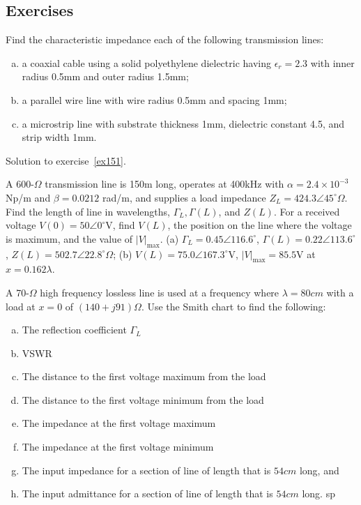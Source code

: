 \begin{mdframed}[ backgroundcolor=lightblue, linewidth=1pt, hidealllines=true]
\section{Exercises}
\begin{ExerciseList}

\Exercise[label={ex151}]
Find the characteristic impedance each of the following transmission lines:
\begin{enumerate}[(a)]
\item a coaxial cable using a solid polyethylene dielectric having $\epsilon_r = 2.3$ with inner radius 0.5mm and outer radius 1.5mm; 
\item a parallel wire line with wire radius 0.5mm and spacing 1mm; 
\item a microstrip line with substrate thickness 1mm, dielectric constant 4.5, and strip width 1mm.
\end{enumerate}
\Answer[ref={ex151}]
Solution to exercise~\ref{ex151}.

\Exercise[label={ex152}]
A 600-$\varOmega$ transmission line is 150m long, operates at 400kHz with $\alpha = 2.4\times 10^{-3}$ Np/m and $\beta = 0.0212$ rad/m, and supplies a load impedance $Z_L = 424.3\angle45^{\circ}\varOmega$. Find the length of line in wavelengths, $\Gamma_L, \Gamma(L)$, and $Z(L)$. For a received voltage $V(0) = 50\angle0^{\circ}$V, find $V(L)$, the position on the line where the voltage is maximum, and the value of $|V|_\max$.
\Answer[ref={ex152}]
(a) $\Gamma_L = 0.45\angle116.6^{\circ}$, $\Gamma(L) = 0.22\angle113.6^{\circ}$, $Z(L) = 502.7\angle22.8^{\circ}\varOmega$; (b) $V(L) = 75.0\angle167.3^{\circ}$V, $|V|_\max = 85.5$V at $x = 0.162\lambda$.

\Exercise[label={ex153}]
A 70-$\varOmega$ high frequency lossless line is used at a frequency where $\lambda = 80cm$ with a load at $x = 0$ of $(140 + j91)\varOmega$. Use the Smith chart to find the following:
\begin{enumerate}[(a)]
\item The reflection coefficient $\Gamma_L$ 
\item VSWR
\item The distance to the first voltage maximum from the load
\item The distance to the first voltage minimum from the load
\item The impedance at the first voltage maximum
\item The impedance at the first voltage minimum
\item The input impedance for a section of line of length that is $54cm$ long, and
\item The input admittance for a section of line of length that is $54cm$ long.
sp
\end{enumerate}
\end{ExerciseList}
\end{mdframed}